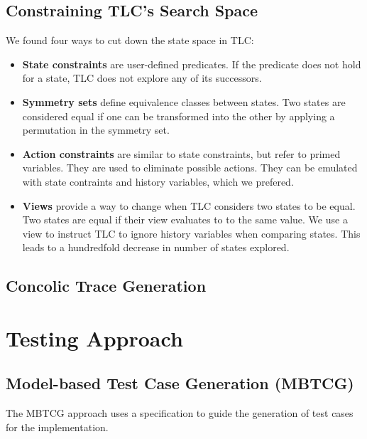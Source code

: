 \documentclass[a4paper]{article}
\begin{document}
\subsection{Constraining TLC's Search Space}

We found four ways to cut down the state space in TLC:

\begin{itemize}
    \item \textbf{State constraints} are user-defined predicates.
    If the predicate does not hold for a state, TLC does not explore any of its successors.

    \item \textbf{Symmetry sets} define equivalence classes between states.
    Two states are considered equal if one can be transformed into the other by applying a permutation in the symmetry set.

    \item \textbf{Action constraints} are similar to state constraints, but refer to primed variables.
    They are used to eliminate possible actions.
    They can be emulated with state contraints and history variables, which we prefered.
    
    \item \textbf{Views} provide a way to change when TLC considers two states to be equal.
    Two states are equal if their view evaluates to to the same value.
    We use a view to instruct TLC to ignore history variables when comparing states.
    This leads to a hundredfold decrease in number of states explored.
\end{itemize}

\subsection{Concolic Trace Generation}

\section{Testing Approach}

\subsection{Model-based Test Case Generation (MBTCG)}
\label{sec: interpreter}

The MBTCG approach uses a specification to guide the generation of test cases for the implementation.
\end{document}
